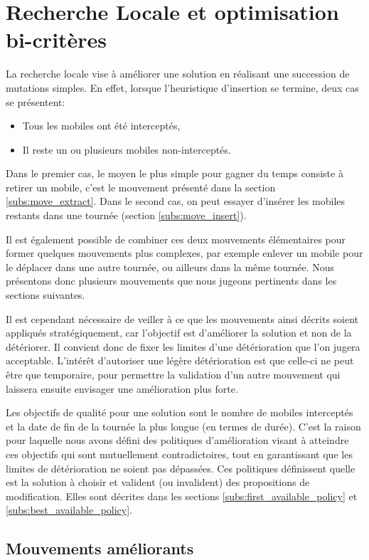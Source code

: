 	\section{Recherche Locale et optimisation bi-critères}
		La recherche locale vise à améliorer une solution en réalisant une succession de mutations simples. En effet, lorsque l'heuristique d'insertion se termine, deux cas se présentent:
		\begin{itemize}
			\item Tous les mobiles ont été interceptés,
			\item Il reste un ou plusieurs mobiles non-interceptés.
		\end{itemize}

		Dans le premier cas, le moyen le plus simple pour gagner du temps consiste à retirer un mobile, c'est le mouvement présenté dans la section \ref{subs:move_extract}. Dans le second cas, on peut essayer d'insérer les mobiles restants dans une tournée (section \ref{subs:move_insert}).

		Il est également possible de combiner ces deux mouvements élémentaires pour former quel\-ques mouvements plus complexes, par exemple enlever un mobile pour le déplacer dans une autre tournée, ou ailleurs dans la même tournée. Nous présentons donc plusieurs mouvements que nous jugeons pertinents dans les sections suivantes.

		Il est cependant nécessaire de veiller à ce que les mouvements ainsi décrits soient appliqués stratégiquement, car l'objectif est d'améliorer la solution et non de la détériorer. Il convient donc de fixer les limites d'une détérioration que l'on jugera acceptable. L'intérêt d'autoriser une légère détérioration est que celle-ci ne peut être que temporaire, pour permettre la validation d'un autre mouvement qui laissera ensuite envisager une amélioration plus forte.

		Les objectifs de qualité pour une solution sont le nombre de mobiles interceptés et la date de fin de la tournée la plus longue (en termes de durée). C'est la raison pour laquelle nous avons défini des politiques d'amélioration visant à atteindre ces objectifs qui sont mutuellement contradictoires, tout en garantissant que les limites de détérioration ne soient pas dépassées. Ces politiques définissent quelle est la solution à choisir et valident (ou invalident) des propositions de modification. Elles sont décrites dans les sections \ref{subs:first_available_policy} et \ref{subs:best_available_policy}.

		\subsection{Mouvements améliorants}

